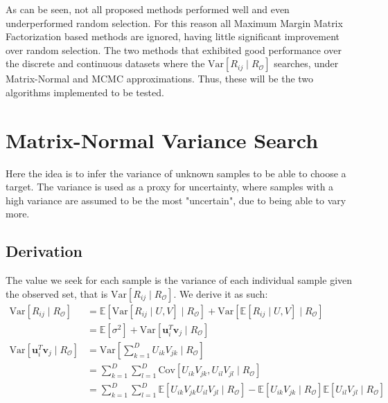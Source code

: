 
As can be seen, not all proposed methods performed well and even underperformed random selection. For this reason all Maximum Margin Matrix Factorization based methods are ignored, having little significant improvement over random selection. The two methods that exhibited good performance over the discrete and continuous datasets where the $\mathrm{Var}[R_{ij} \mid R_\mathcal{O}]$ searches, under Matrix-Normal and MCMC approximations. Thus, these will be the two algorithms implemented to be tested.

\section{Matrix-Normal Variance Search}
\label{sec:mnvar}
Here the idea is to infer the variance of unknown samples to be able to choose a target. The variance is used as a proxy for uncertainty, where samples with a high variance are assumed to be the most "uncertain", due to being able to vary more.
\subsection{Derivation}
The value we seek for each sample is the variance of each individual sample given the observed set, that is $\mathrm{Var}[R_{ij} \mid R_\mathcal{O}]$. We derive it as such:
\begin{align*}
\mathrm{Var}[R_{ij} \mid R_\mathcal{O}] &= \mathbb{E} [\mathrm{Var}[R_{ij} \mid U,V] \mid R_\mathcal{O}] + \mathrm{Var} [\mathbb{E}[R_{ij} \mid U,V] \mid R_\mathcal{O}]\\
&= \mathbb{E}[\sigma^2] + \mathrm{Var}[\mathbf{u}_i^T \mathbf{v}_j \mid R_\mathcal{O}] \\
\mathrm{Var}[\mathbf{u}_i^T \mathbf{v}_j \mid R_\mathcal{O}] &= \mathrm{Var}\left[\sum\limits_{k=1}^{D} U_{ik}V_{jk} \mid R_\mathcal{O}\right] \\
&= \sum\limits_{k=1}^{D} \sum\limits_{l=1}^{D} \mathrm{Cov}[U_{ik}V_{jk},U_{il}V_{jl} \mid R_\mathcal{O}] \\
&= \sum\limits_{k=1}^{D} \sum\limits_{l=1}^{D} \mathbb{E}[U_{ik}V_{jk}U_{il}V_{jl} \mid R_\mathcal{O}] - \mathbb{E}[U_{ik}V_{jk} \mid R_\mathcal{O}] \mathbb{E}[U_{il}V_{jl} \mid R_\mathcal{O}]\\
\end{align*}


